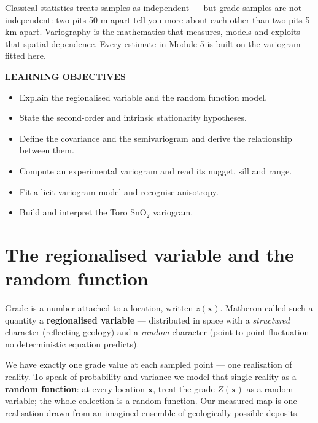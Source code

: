 \documentclass[11pt]{article}
\begin{document}

Classical statistics treats samples as independent --- but grade samples
are not independent: two pits 50 m apart tell you more about each other
than two pits 5 km apart. Variography is the mathematics that measures,
models and exploits that spatial dependence. Every estimate in Module 5
is built on the variogram fitted here.

\begin{objbox}
{\sffamily\bfseries\color{bronze}LEARNING OBJECTIVES}
\begin{itemize}[leftmargin=14pt,itemsep=2pt]
\item Explain the regionalised variable and the random function model.
\item State the second-order and intrinsic stationarity hypotheses.
\item Define the covariance and the semivariogram and derive the
relationship between them.
\item Compute an experimental variogram and read its nugget, sill and
range.
\item Fit a licit variogram model and recognise anisotropy.
\item Build and interpret the Toro SnO$_2$ variogram.
\end{itemize}
\end{objbox}

\section{The regionalised variable and the random function}

Grade is a number attached to a location, written $z(\mathbf{x})$.
Matheron called such a quantity a \textbf{regionalised variable} ---
distributed in space with a \emph{structured} character (reflecting
geology) and a \emph{random} character (point-to-point fluctuation no
deterministic equation predicts).

We have exactly one grade value at each sampled point --- one realisation
of reality. To speak of probability and variance we model that single
reality as a \textbf{random function}: at every location $\mathbf{x}$,
treat the grade $Z(\mathbf{x})$ as a random variable; the whole collection
is a random function. Our measured map is one realisation drawn from an
imagined ensemble of geologically possible deposits.
\end{document}
